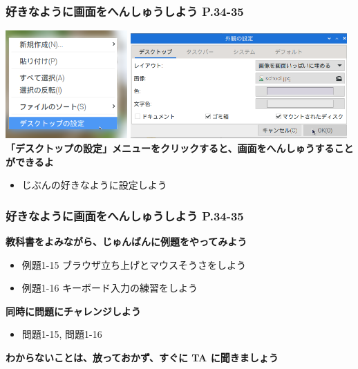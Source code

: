 \documentclass[dvipdfmx]{beamer}
\begin{document}
\begin{frame}[fragile]
	\frametitle{好きなように画面をへんしゅうしよう P.34-35~~~}
  \includegraphics[width=0.35\textwidth]{slide02_007.png}
  \hfill
  \includegraphics[width=0.62\textwidth]{slide02_008.png}
  \vfill
  \large\textbf{「デスクトップの設定」メニューをクリックすると、画面をへんしゅうすることができるよ}
  \begin{itemize}
    \item じぶんの好きなように設定しよう
  \end{itemize}

\end{frame}

\begin{frame}[fragile]
	\frametitle{好きなように画面をへんしゅうしよう P.34-35~~~}
    \large\textbf{教科書をよみながら、じゅんばんに例題をやってみよう}
    				\begin{itemize}
    					\item 例題1-15 ブラウザ立ち上げとマウスそうさをしよう
    					\item 例題1-16 キーボード入力の練習をしよう
    				\end{itemize}
          \vfill
          \large\textbf{同時に問題にチャレンジしよう}
          \begin{itemize}
            \item 問題1-15, 問題1-16
          \end{itemize}
          \vfill
          \large\textbf{わからないことは、放っておかず、すぐに TA に聞きましょう}
\end{frame}
\end{document}
